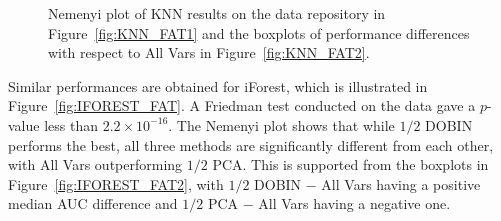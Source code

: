\documentclass[letter,12pt]{article}
\begin{document}
\begin{figure}[!ht]
	\centering
	\hfill
	\caption{Nemenyi plot of KNN results on the data repository in Figure~\ref{fig:KNN_FAT1} and the boxplots of performance differences with respect to All Vars in Figure~\ref{fig:KNN_FAT2}.}
	\label{fig:KNN_FAT}
\end{figure}

Similar performances are obtained for iForest, which is illustrated in Figure~\ref{fig:IFOREST_FAT}. A Friedman test conducted on the data gave a $p$-value less than $2.2 \times 10^{-16}$. The Nemenyi plot shows that while $1/2$ DOBIN performs the best, all three methods are significantly different from each other, with All Vars outperforming $1/2$ PCA. This is supported from the boxplots in Figure~\ref{fig:IFOREST_FAT2}, with $1/2$ DOBIN $-$ All Vars having a positive median AUC difference and  $1/2$ PCA $-$ All Vars having a negative one.

\end{document}
